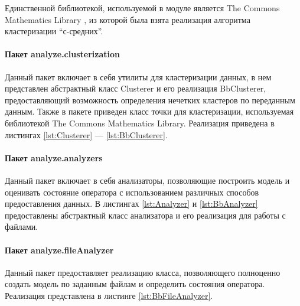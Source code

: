 Единственной библиотекой, используемой в модуле является The Commons Mathematics Library \cite{apachemath3}, из которой была взята реализация алгоритма кластеризации ``с-средних''.

\paragraph{Пакет analyze.clusterization \newline}

Данный пакет включает в себя утилиты для кластеризации данных, в нем представлен абстрактный класс Clusterer и его реализация BbClusterer, предоставляющий возможность определения нечетких кластеров по переданным данным. Также в пакете приведен класс точки для кластеризации, используемая библиотекой The Commons Mathematics Library. Реализация приведена в листингах \ref{lst:Clusterer} --- \ref{lst:BbClusterer}.







\paragraph{Пакет analyze.analyzers}

Данный пакет включает в себя анализаторы, позволяющие построить модель и оценивать состояние оператора с использованием различных способов предоставления данных. В листингах \ref{lst:Analyzer} и \ref{lst:BbAnalyzer} предоставлены абстрактный класс анализатора и его реализация для работы с файлами.





\paragraph{Пакет analyze.fileAnalyzer}
Данный пакет предоставляет реализацию класса, позволяющего полноценно создать модель по заданным файлам и определить состояния оператора. Реализация представлена в листинге \ref{lst:BbFileAnalyzer}.

